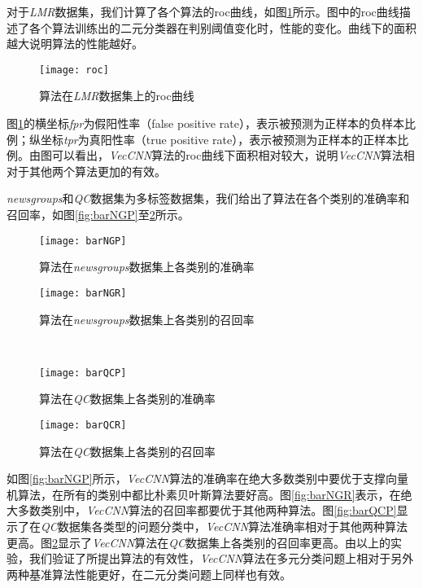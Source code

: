 对于\textit{LMR}数据集，我们计算了各个算法的roc曲线，如图\ref{fig:roc}所示。图中的roc曲线描述了各个算法训练出的二元分类器在判别阈值变化时，性能的变化。曲线下的面积越大说明算法的性能越好。

\begin{figure}[!htbp]
  \centering
  \texttt{[image: roc]}
  \caption{算法在\textit{LMR}数据集上的roc曲线}
  \label{fig:roc}
\end{figure}

图\ref{fig:roc}的横坐标\textit{fpr}为假阳性率（false positive rate），表示被预测为正样本的负样本比例；纵坐标\textit{tpr}为真阳性率（true positive rate），表示被预测为正样本的正样本比例。由图可以看出，\textit{VecCNN}算法的roc曲线下面积相对较大，说明\textit{VecCNN}算法相对于其他两个算法更加的有效。

\textit{newsgroups}和\textit{QC}数据集为多标签数据集，我们给出了算法在各个类别的准确率和召回率，如图\ref{fig:barNGP}至\ref{fig:barQCR}所示。

\begin{figure}[!htbp]
   \begin{minipage}{0.48\textwidth}
     \centering
     \texttt{[image: barNGP]}
     \caption{算法在\textit{newsgroups}数据集上各类别的准确率}
     \label{fig:barNGP}
   \end{minipage}
   \hfill
   \begin{minipage}{0.48\textwidth}
     \centering
     \texttt{[image: barNGR]}
     \caption{算法在\textit{newsgroups}数据集上各类别的召回率}
     \label{fig:barNGR}
   \end{minipage}
   \\ 
   \begin {minipage}{0.48\textwidth}
     \centering
     \texttt{[image: barQCP]}
     \caption{算法在\textit{QC}数据集上各类别的准确率}
     \label{fig:barQCP}
   \end{minipage}
   \hfill
   \begin {minipage}{0.48\textwidth}
     \centering
     \texttt{[image: barQCR]}
     \caption{算法在\textit{QC}数据集上各类别的召回率}
     \label{fig:barQCR}
   \end{minipage}
\end{figure}

如图\ref{fig:barNGP}所示，\textit{VecCNN}算法的准确率在绝大多数类别中要优于支撑向量机算法，在所有的类别中都比朴素贝叶斯算法要好高。图\ref{fig:barNGR}表示，在绝大多数类别中，\textit{VecCNN}算法的召回率都要优于其他两种算法。图\ref{fig:barQCP}显示了在\textit{QC}数据集各类型的问题分类中，\textit{VecCNN}算法准确率相对于其他两种算法更高。图\ref{fig:barQCR}显示了\textit{VecCNN}算法在\textit{QC}数据集上各类别的召回率更高。由以上的实验，我们验证了所提出算法的有效性，\textit{VecCNN}算法在多元分类问题上相对于另外两种基准算法性能更好，在二元分类问题上同样也有效。

